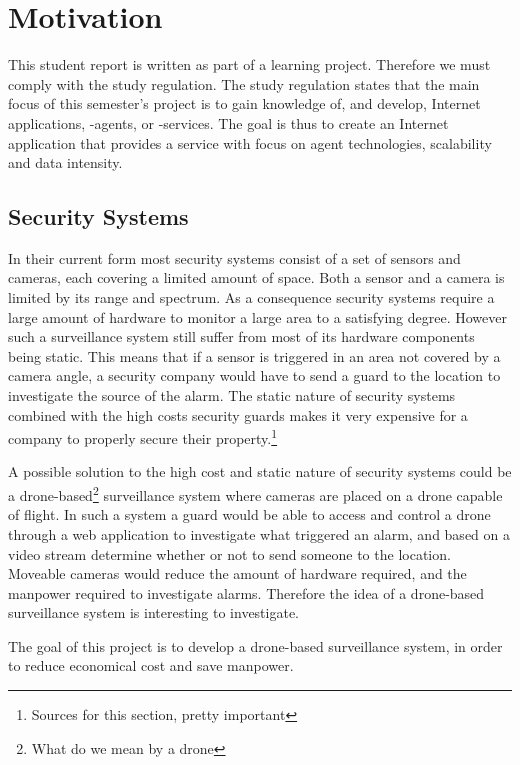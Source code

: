 \section{Motivation}
This student report is written as part of a learning project. Therefore we must comply with the study regulation.
The study regulation states that the main focus of this semester's project is to gain knowledge of, and develop, Internet applications, -agents, or -services.
The goal is thus to create an Internet application that provides a service with focus on agent technologies, scalability and data intensity.

\subsection{Security Systems}
In their current form most security systems consist of a set of sensors and cameras, each covering a limited amount of space.
Both a sensor and a camera is limited by its range and spectrum.
As a consequence security systems require a large amount of hardware to monitor a large area to a satisfying degree.
However such a surveillance system still suffer from most of its hardware components being static.
This means that if a sensor is triggered in an area not covered by a camera angle, a security company would have to send a guard to the location to investigate the source of the alarm.
The static nature of security systems combined with the high costs security guards makes it very expensive for a company to properly secure their property.\footnote{Sources for this section, pretty important}

A possible solution to the high cost and static nature of security systems could be a drone-based\footnote{What do we mean by a drone} surveillance system where cameras are placed on a drone capable of flight.
In such a system a guard would be able to access and control a drone through a web application to investigate what triggered an alarm, and based on a video stream determine whether or not to send someone to the location.
Moveable cameras would reduce the amount of hardware required, and the manpower required to investigate alarms.
Therefore the idea of a drone-based surveillance system is interesting to investigate.

The goal of this project is to develop a drone-based surveillance system, in order to reduce economical cost and save manpower.



